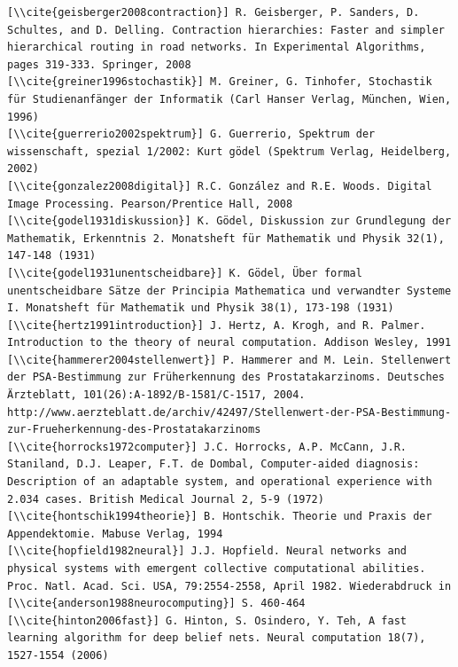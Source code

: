 \documentclass[10pt]{book}
\begin{document}
\begin{verbatim}
[\\cite{geisberger2008contraction}] R. Geisberger, P. Sanders, D. Schultes, and D. Delling. Contraction hierarchies: Faster and simpler hierarchical routing in road networks. In Experimental Algorithms, pages 319-333. Springer, 2008
[\\cite{greiner1996stochastik}] M. Greiner, G. Tinhofer, Stochastik für Studienanfänger der Informatik (Carl Hanser Verlag, München, Wien, 1996)
[\\cite{guerrerio2002spektrum}] G. Guerrerio, Spektrum der wissenschaft, spezial 1/2002: Kurt gödel (Spektrum Verlag, Heidelberg, 2002)
[\\cite{gonzalez2008digital}] R.C. González and R.E. Woods. Digital Image Processing. Pearson/Prentice Hall, 2008
[\\cite{godel1931diskussion}] K. Gödel, Diskussion zur Grundlegung der Mathematik, Erkenntnis 2. Monatsheft für Mathematik und Physik 32(1), 147-148 (1931)
[\\cite{godel1931unentscheidbare}] K. Gödel, Über formal unentscheidbare Sätze der Principia Mathematica und verwandter Systeme I. Monatsheft für Mathematik und Physik 38(1), 173-198 (1931)
[\\cite{hertz1991introduction}] J. Hertz, A. Krogh, and R. Palmer. Introduction to the theory of neural computation. Addison Wesley, 1991
[\\cite{hammerer2004stellenwert}] P. Hammerer and M. Lein. Stellenwert der PSA-Bestimmung zur Früherkennung des Prostatakarzinoms. Deutsches Ärzteblatt, 101(26):A-1892/B-1581/C-1517, 2004. http://www.aerzteblatt.de/archiv/42497/Stellenwert-der-PSA-Bestimmung-zur-Frueherkennung-des-Prostatakarzinoms
[\\cite{horrocks1972computer}] J.C. Horrocks, A.P. McCann, J.R. Staniland, D.J. Leaper, F.T. de Dombal, Computer-aided diagnosis: Description of an adaptable system, and operational experience with 2.034 cases. British Medical Journal 2, 5-9 (1972)
[\\cite{hontschik1994theorie}] B. Hontschik. Theorie und Praxis der Appendektomie. Mabuse Verlag, 1994
[\\cite{hopfield1982neural}] J.J. Hopfield. Neural networks and physical systems with emergent collective computational abilities. Proc. Natl. Acad. Sci. USA, 79:2554-2558, April 1982. Wiederabdruck in [\\cite{anderson1988neurocomputing}] S. 460-464
[\\cite{hinton2006fast}] G. Hinton, S. Osindero, Y. Teh, A fast learning algorithm for deep belief nets. Neural computation 18(7), 1527-1554 (2006)

\end{verbatim}
\end{document}
